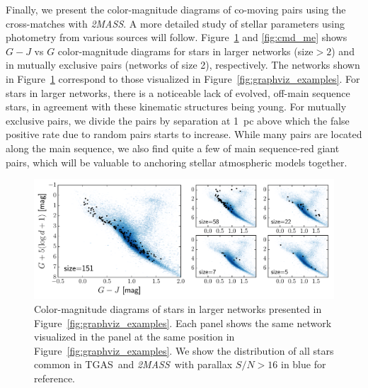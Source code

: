 \documentclass[manuscript, letterpaper]{aastex6}
\newcommand{\project}[1]{\textsl{#1}}
\newcommand{\acronym}[1]{{\small{#1}}}
\newcommand{\tmass}{\project{\acronym{2MASS}}}
\newcommand{\tgas}{\acronym{TGAS}}
\begin{document}
Finally, we present the color-magnitude diagrams of co-moving pairs
using the cross-matches with \tmass.
A more detailed study of stellar parameters using photometry from various sources
will follow. Figure~\ref{fig:cmd_large} and \ref{fig:cmd_me} shows $G-J$ vs $G$
color-magnitude diagrams for stars in larger networks (size$>2$) and in mutually
exclusive pairs (networks of size 2), respectively.
The networks shown in Figure~\ref{fig:cmd_large} correspond to those visualized
in Figure~\ref{fig:graphviz_examples}.
For stars in larger networks, there is a noticeable lack of evolved, off-main sequence
stars, in agreement with these kinematic structures being young.
For mutually exclusive pairs, we divide the pairs by separation at 1~pc
above which the false positive rate due to random pairs starts to increase.
While many pairs are located along the main sequence, we also find
quite a few of main sequence-red giant pairs,
which will be valuable to anchoring stellar atmospheric models together.

\begin{figure}[htbp]
  \begin{center}
    \includegraphics[width=\textwidth]{figures/gjg_graphviz_examples.pdf}
  \end{center}
  \caption{
    Color-magnitude diagrams of stars in larger networks presented in
    Figure~\ref{fig:graphviz_examples}. Each panel shows the same network
    visualized in the panel at the same position
    in Figure~\ref{fig:graphviz_examples}.
    We show the distribution of all stars common in \tgas\ and \tmass\
    with parallax $S/N>16$ in blue for reference.
    \label{fig:cmd_large}}
\end{figure}
\end{document}
